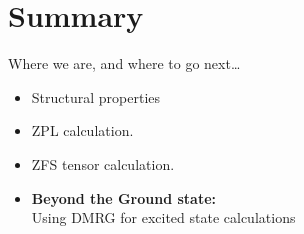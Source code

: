 \documentclass[handout]{beamer}
\begin{document}
\section{Summary} %




\begin{frame}{Where we are, and where to go next\ldots}
  \begin{itemize}
    \item Structural properties
    \item ZPL calculation.
    \item ZFS tensor calculation.
    \item \textbf{Beyond the Ground state:}\\
      Using DMRG for excited state calculations
  \end{itemize}
\end{frame}
\end{document}
